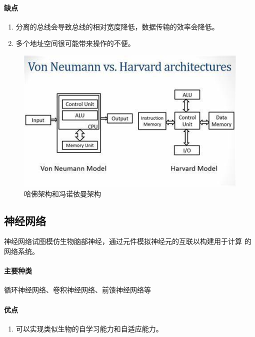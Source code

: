 \documentclass[UTF8]{ctexart}
\begin{document}
\paragraph*{缺点}

\begin{enumerate}
    \item 分离的总线会导致总线的相对宽度降低，数据传输的效率会降低。
    \item 多个地址空间很可能带来操作的不便。
\end{enumerate}

\begin{figure}[H]
\includegraphics[width=\textwidth]{./pics/18.jpg}
\caption{哈佛架构和冯诺依曼架构}
\end{figure}

\subsection{神经网络}

神经网络试图模仿生物脑部神经，通过元件模拟神经元的互联以构建用于计算
的网络系统。

\paragraph*{主要种类}

循环神经网络、卷积神经网络、前馈神经网络等

\paragraph*{优点}

\begin{enumerate}
    \item 可以实现类似生物的自学习能力和自适应能力。
\end{enumerate}
\end{document}

